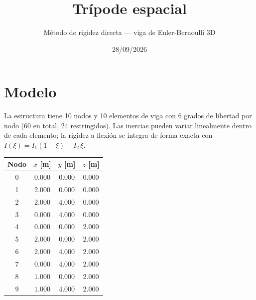 \documentclass[11pt,a4paper]{article}
\title{Trípode espacial}
\author{Método de rigidez directa --- viga de Euler-Bernoulli 3D}
\date{28/09/2026}
\begin{document}
\maketitle

\section{Modelo}

La estructura tiene 10 nodos y 10 elementos de viga con 6 grados de libertad por nodo (60 en total, 24 restringidos). Las inercias pueden variar linealmente dentro de cada elemento; la rigidez a flexión se integra de forma exacta con $I(\xi)=I_1(1-\xi)+I_2\,\xi$.

\begin{center}
\begin{minipage}{\linewidth}
\centering
{}\label{tab:viga3d-nodos}
\begin{tabular}{@{}cccc@{}}
\toprule
Nodo & $x$ [m] & $y$ [m] & $z$ [m] \\
\midrule
0 & $0.000$ & $0.000$ & $0.000$ \\
1 & $2.000$ & $0.000$ & $0.000$ \\
2 & $2.000$ & $4.000$ & $0.000$ \\
3 & $0.000$ & $4.000$ & $0.000$ \\
4 & $0.000$ & $0.000$ & $2.000$ \\
5 & $2.000$ & $0.000$ & $2.000$ \\
6 & $2.000$ & $4.000$ & $2.000$ \\
7 & $0.000$ & $4.000$ & $2.000$ \\
8 & $1.000$ & $0.000$ & $2.000$ \\
9 & $1.000$ & $4.000$ & $2.000$ \\
\bottomrule
\end{tabular}
\end{minipage}
\end{center}
\end{document}
